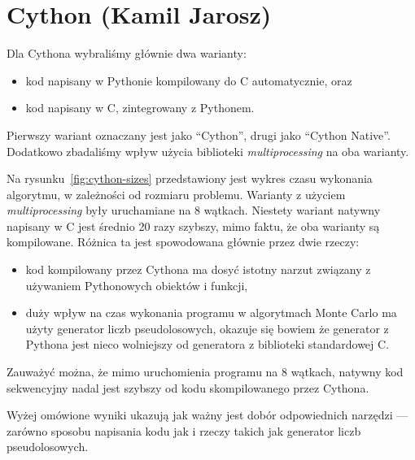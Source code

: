 \section{Cython (Kamil Jarosz)}


\begin{figure*}
    \centering
    
    \caption{Czas wykonania algorytmu w Cythonie w zależności od rozmiaru problemu}
    \label{fig:cython-sizes}
\end{figure*}

Dla Cythona wybraliśmy głównie dwa warianty:
\begin{itemize}
    \item kod napisany w Pythonie kompilowany do C automatycznie, oraz
    \item kod napisany w C, zintegrowany z Pythonem.
\end{itemize}
Pierwszy wariant oznaczany jest jako ``Cython'', drugi jako ``Cython Native''.
Dodatkowo zbadaliśmy wpływ użycia biblioteki \textit{multiprocessing}
na oba warianty.

Na rysunku~\ref{fig:cython-sizes} przedstawiony jest wykres czasu wykonania
algorytmu, w zależności od rozmiaru problemu.
Warianty z użyciem \textit{multiprocessing} były uruchamiane na
8 wątkach.
Niestety wariant natywny napisany w C jest średnio 20 razy szybszy,
mimo faktu, że oba warianty są kompilowane.
Różnica ta jest spowodowana głównie przez dwie rzeczy:
\begin{itemize}
    \item kod kompilowany przez Cythona ma dosyć istotny narzut związany z
    używaniem Pythonowych obiektów i funkcji,
    \item duży wpływ na czas wykonania programu w algorytmach Monte Carlo
    ma użyty generator liczb pseudolosowych, okazuje się
    bowiem że generator z Pythona jest nieco wolniejszy od
    generatora z biblioteki standardowej C\@.
\end{itemize}
Zauważyć można, że mimo uruchomienia programu na 8 wątkach,
natywny kod sekwencyjny nadal jest szybszy od kodu skompilowanego przez
Cythona.

Wyżej omówione wyniki ukazują jak ważny jest dobór odpowiednich narzędzi
--- zarówno sposobu napisania kodu jak i rzeczy takich jak generator
liczb pseudolosowych.

